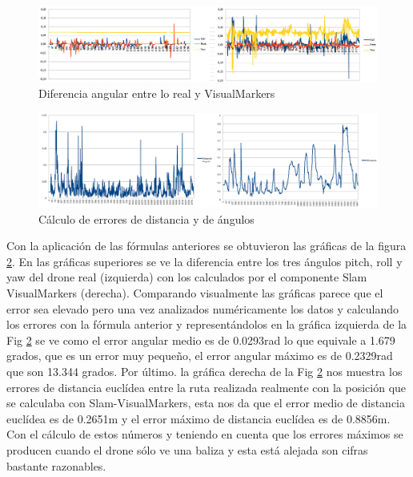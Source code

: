 \begin{figure}[H]
	\begin{center}
		\includegraphics[width=1\textwidth]{imag/IMG90.PNG}
				\caption{Diferencia angular entre lo real y VisualMarkers}
		\label{fig:Error angular.}	
	\end{center}
\end{figure}

\begin{figure}[H]
	\begin{center}
		\includegraphics[width=1\textwidth]{imag/IMG91.PNG}
				\caption{Cálculo de errores de distancia y de ángulos}
		\label{fig:Error de distancia y de giro.}	
	\end{center}
\end{figure}

\hspace{1cm} Con la aplicación de las fórmulas anteriores se obtuvieron las gráficas de la figura \ref{fig:Error de distancia y de giro.}. En las gráficas superiores se ve la diferencia entre los tres ángulos pitch, roll y yaw del drone real (izquierda) con los calculados por el componente Slam VisualMarkers (derecha). Comparando visualmente las gráficas parece que el error sea elevado pero una vez analizados numéricamente los datos y calculando los errores con la fórmula anterior y representándolos en la gráfica izquierda de la Fig \ref{fig:Error de distancia y de giro.} se ve como el error angular medio es de 0.0293rad lo que equivale a 1.679 grados, que es un error muy pequeño, el error angular máximo es de 0.2329rad que son 13.344 grados. Por último. la gráfica derecha de la Fig \ref{fig:Error de distancia y de giro.} nos muestra los errores de distancia euclídea entre la ruta realizada realmente con la posición que se calculaba con Slam-VisualMarkers, esta nos da que el error medio de distancia euclídea es de 0.2651m y el error máximo de distancia euclídea es de 0.8856m. Con el cálculo de estos números y teniendo en cuenta que los errores máximos se producen cuando el drone sólo ve una baliza y esta está alejada son cifras bastante razonables.

